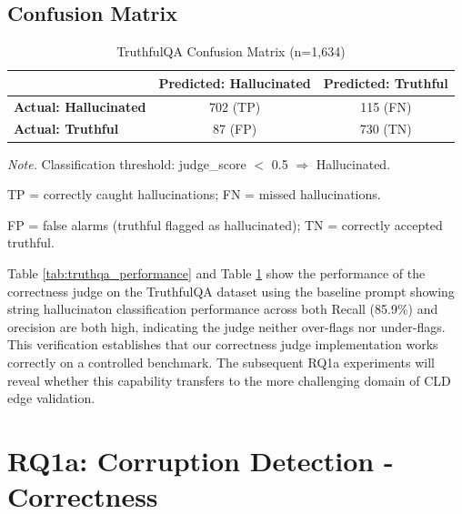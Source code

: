 \documentclass{article}
\begin{document}
\subsection{Confusion Matrix}

\begin{table}[H]
\centering
\caption{TruthfulQA Confusion Matrix (n=1,634)}
\label{tab:truthqa_confusion}
\begin{threeparttable}
\begin{tabular}{lcc}
\toprule
 & \textbf{Predicted: Hallucinated} & \textbf{Predicted: Truthful} \\
\midrule
\textbf{Actual: Hallucinated} & 702 (TP) & 115 (FN) \\
\textbf{Actual: Truthful} & 87 (FP) & 730 (TN) \\
\bottomrule
\end{tabular}
\begin{tablenotes}
\small
\item \textit{Note.} Classification threshold: judge\_score $<$ 0.5 $\Rightarrow$ Hallucinated.
\item TP = correctly caught hallucinations; FN = missed hallucinations.
\item FP = false alarms (truthful flagged as hallucinated); TN = correctly accepted truthful.
\end{tablenotes}
\end{threeparttable}
\end{table}

Table \ref{tab:truthqa_performance} and 
Table \ref{tab:truthqa_confusion} show the performance of the correctness judge on the TruthfulQA dataset using the baseline prompt showing string hallucinaton classification performance across  both Recall (85.9\%) and orecision are both high, indicating the judge neither over-flags nor under-flags. This verification establishes that our correctness judge implementation works correctly on a controlled benchmark. The subsequent RQ1a experiments will reveal whether this capability transfers to the more challenging domain of CLD edge validation.

\section{RQ1a: Corruption Detection - Correctness}

\end{document}
